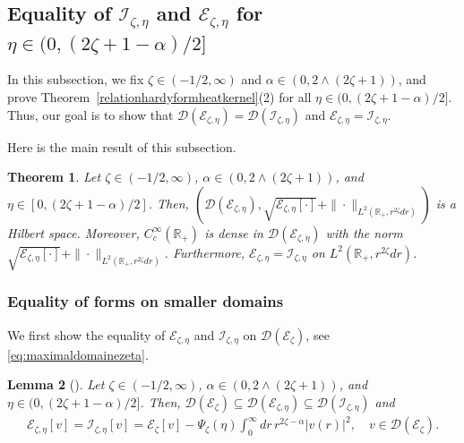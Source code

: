 \documentclass[12pt,reqno]{amsart}
\newtheorem{theorem}{Theorem}[section]
\newtheorem{lemma}[theorem]{Lemma}
\theoremstyle{definition}
\theoremstyle{remark}
\numberwithin{equation}{section}
\newcommand{\1}{\mathbbm{1}}
\newcommand{\D}{\mathcal{D}}
\newcommand{\R}{\mathbb{R}}
\def\ce{\mathcal{E}}
\def\ci{\mathcal{I}}
\begin{document}
\subsection{Equality of $\ci_{\zeta,\eta}$ and $\ce_{\zeta,\eta}$ for $\eta\in(0,(2\zeta+1-\alpha)/2]$}
\label{s:connectiongenerators}

In this subsection, we 
fix $\zeta\in(-1/2,\infty)$ and $\alpha\in(0,2\wedge(2\zeta+1))$, and prove Theorem~\ref{relationhardyformheatkernel}(2) for all $\eta\in(0,(2\zeta+1-\alpha)/2]$.
Thus, our goal is to show  that $\D(\ce_{\zeta,\eta})=\D(\ci_{\zeta,\eta})$ and  $\ce_{\zeta,\eta}=\ci_{\zeta,\eta}$.

Here is the main result of this subsection.

\begin{theorem}
  \label{bogthm51}
  Let $\zeta\in(-1/2,\infty)$, $\alpha\in(0,2\wedge(2\zeta+1))$, and $\eta\in[0,(2\zeta+1-\alpha)/2]$. Then, $(\D(\ce_{\zeta,\eta}),\sqrt{\ce_{\zeta,\eta}[\cdot]}+\|\cdot\|_{L^2(\R_+,r^{2\zeta}dr)})$ is a Hilbert space.
  Moreover, $C_c^\infty(\R_+)$ is dense in $\D(\ce_{\zeta,\eta})$ with the norm $\sqrt{\ce_{\zeta,\eta}[\cdot]}+\|\cdot\|_{L^2(\R_+,r^{2\zeta}dr)}$.
  Furthermore, $\ce_{\zeta,\eta}=\ci_{\zeta,\eta}$ on $L^2(\R_+,r^{2\zeta}dr)$.
\end{theorem}


\subsubsection{Equality of forms on smaller domains}

We first show the equality of $\ce_{\zeta,\eta}$ and $\ci_{\zeta,\eta}$ on $\D(\ce_\zeta)$, see \eqref{eq:maximaldomainezeta}.

\begin{lemma}[{\cite[Lemma~5.1]{Bogdanetal2019}}]
  \label{boglem51}
  Let $\zeta\in(-1/2,\infty)$, $\alpha\in(0,2\wedge(2\zeta+1))$, and $\eta\in(0,(2\zeta+1-\alpha)/2]$. Then, $\D(\ce_\zeta)\subseteq\D(\ce_{\zeta,\eta})\subseteq\D(\ci_{\zeta,\eta})$ and
  \begin{align}
    \label{eq:boglem51}
    \ce_{\zeta,\eta}[v] = \ci_{\zeta,\eta}[v] = \ce_\zeta[v] - \Psi_\zeta(\eta)\int_0^\infty dr\, r^{2\zeta-\alpha} |v(r)|^2, \quad v\in\D(\ce_\zeta).
  \end{align}
\end{lemma}
\end{document}
